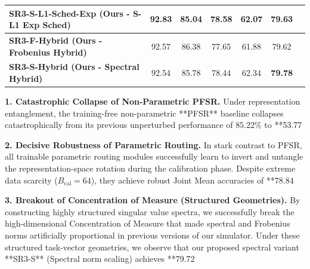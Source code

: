 \begin{table}[t]
\begin{center}
\begin{small}
\begin{sc}
\begin{tabular}{lcccccr}
\textbf{SR3-S-L1-Sched-Exp (Ours - S-L1 Exp Sched)} & 92.83 & 85.04 & 78.58 & 62.07 & 79.63 \\
\midrule
\textbf{SR3-F-Hybrid (Ours - Frobenius Hybrid)} & 92.57 & 86.38 & 77.65 & 61.88 & 79.62 \\
\textbf{SR3-S-Hybrid (Ours - Spectral Hybrid)}  & 92.54 & 85.78 & 78.44 & 62.34 & \textbf{79.78} \\
\bottomrule
\end{tabular}
\end{sc}
\end{small}
\end{center}
\vskip -0.1in
\end{table}

\textbf{1. Catastrophic Collapse of Non-Parametric PFSR.}
Under representation entanglement, the training-free non-parametric **PFSR** baseline collapses catastrophically from its previous unperturbed performance of $85.22\%$ to **53.77%

\textbf{2. Decisive Robustness of Parametric Routing.}
In stark contrast to PFSR, all trainable parametric routing modules successfully learn to invert and untangle the representation-space rotation during the calibration phase. Despite extreme data scarcity ($B_{\text{cal}}=64$), they achieve robust Joint Mean accuracies of **78.84%

\textbf{3. Breakout of Concentration of Measure (Structured Geometries).}
By constructing highly structured singular value spectra, we successfully break the high-dimensional Concentration of Measure that made spectral and Frobenius norms artificially proportional in previous versions of our simulator. Under these structured task-vector geometries, we observe that our proposed spectral variant **SR3-S** (Spectral norm scaling) achieves **79.72%

